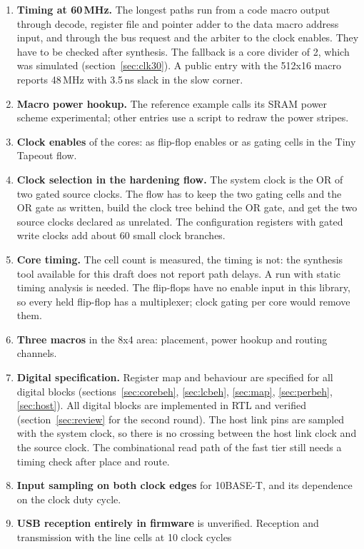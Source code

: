 \documentclass[10pt,a4paper]{article}
\begin{document}
\begin{enumerate}
\item \textbf{Timing at 60\,MHz.} The longest paths run from a code macro output through decode, register file and pointer adder to the data macro address input, and through the bus request and the arbiter to the clock enables. They have to be checked after synthesis. The fallback is a core divider of 2, which was simulated (section~\ref{sec:clk30}). A public entry with
the 512x16 macro reports 48\,MHz with 3.5\,ns slack in the slow corner.
\item \textbf{Macro power hookup.} The reference example calls its SRAM power scheme experimental; other entries
use a script to redraw the power stripes.
\item \textbf{Clock enables} of the cores: as flip-flop enables or as gating cells in the Tiny Tapeout flow.
\item \textbf{Clock selection in the hardening flow.} The system clock is the OR of two gated source clocks. The flow has to keep the two gating cells and the OR gate as written, build the clock tree behind the OR gate, and get the two source clocks declared as unrelated. The configuration registers with gated write clocks add about 60 small clock branches.
\item \textbf{Core timing.} The cell count is measured, the timing is not: the synthesis tool available for this draft does not report path delays. A run with static timing analysis is needed. The flip-flops have no enable input in this library, so every held flip-flop has a multiplexer; clock gating per core would remove them.
\item \textbf{Three macros} in the 8x4 area: placement, power hookup and routing channels.
\item \textbf{Digital specification.} Register map and behaviour are specified for all digital blocks
(sections~\ref{sec:corebeh}, \ref{sec:lcbeh}, \ref{sec:map}, \ref{sec:perbeh}, \ref{sec:host}). All digital blocks are implemented in RTL and verified (section~\ref{sec:review} for the second round). The host link pins are sampled with the system clock, so there is no crossing between the host link clock and the source clock. The combinational read path of the
fast tier still needs a timing check after place and route.
\item \textbf{Input sampling on both clock edges} for 10BASE-T, and its dependence on the clock duty cycle.
\item \textbf{USB reception entirely in firmware} is unverified. Reception and transmission with the line cells at 10 clock cycles

\end{enumerate}
\end{document}
